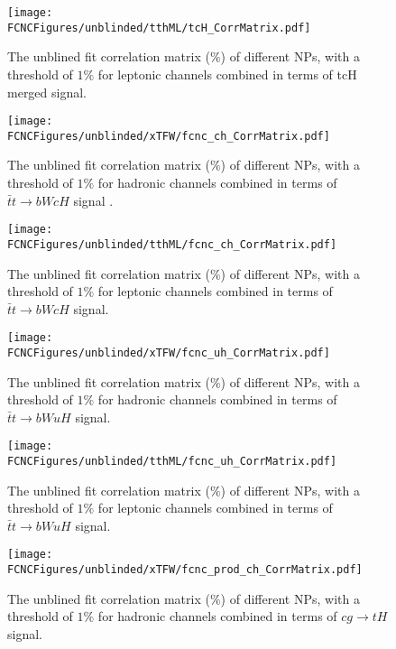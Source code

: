 \begin{figure}[H]
\centering
\texttt{[image: \\FCNCFigures/unblinded/tthML/tcH\_CorrMatrix.pdf]}
\caption{ The unblined fit correlation matrix ($\%$) of different NPs, with a threshold of $1\%$ for leptonic channels combined in terms of tcH merged signal.}
\label{fig:tcH_CorrMatrix_2}
\end{figure}


\begin{figure}[H]
\centering
\texttt{[image: \\FCNCFigures/unblinded/xTFW/fcnc\_ch\_CorrMatrix.pdf]}
\caption{ The unblined fit correlation matrix ($\%$) of different NPs, with a threshold of $1\%$ for hadronic channels combined in terms of $\bar{t}t\to bWcH$ signal . }
\label{fig:fcnc_ch_CorrMatrix_1}
\end{figure}

\begin{figure}[H]
\centering
\texttt{[image: \\FCNCFigures/unblinded/tthML/fcnc\_ch\_CorrMatrix.pdf]}
\caption{ The unblined fit correlation matrix ($\%$) of different NPs, with a threshold of $1\%$ for  leptonic channels combined in terms of $\bar{t}t\to bWcH$ signal. }
\label{fig:fcnc_ch_CorrMatrix_2}
\end{figure}


\begin{figure}[H]
\centering
\texttt{[image: \\FCNCFigures/unblinded/xTFW/fcnc\_uh\_CorrMatrix.pdf]}
\caption{ The unblined fit correlation matrix ($\%$) of different NPs, with a threshold of $1\%$ for hadronic channels combined in terms of $\bar{t}t\to bWuH$ signal.}
\label{fig:fcnc_uh_CorrMatrix_1}
\end{figure}



\begin{figure}[H]
\centering
\texttt{[image: \\FCNCFigures/unblinded/tthML/fcnc\_uh\_CorrMatrix.pdf]}
\caption{ The unblined fit correlation matrix ($\%$) of different NPs, with a threshold of $1\%$ for  leptonic channels combined in terms of $\bar{t}t\to bWuH$ signal.}
\label{fig:fcnc_uh_CorrMatrix_2}
\end{figure}



\begin{figure}[H]
\centering
\texttt{[image: \\FCNCFigures/unblinded/xTFW/fcnc\_prod\_ch\_CorrMatrix.pdf]}
\caption{ The unblined fit correlation matrix ($\%$) of different NPs, with a threshold of $1\%$ for hadronic channels combined in terms of $cg\to tH$ signal.}
\label{fig:fcnc_prod_ch_CorrMatrix_1}
\end{figure}



